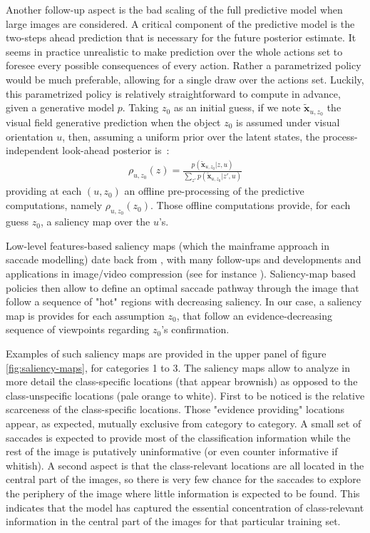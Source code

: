 \documentclass{article} %
\begin{document}
Another follow-up aspect is the bad scaling of the full predictive model when large images are considered. A critical component of the predictive model is the two-steps ahead prediction that is necessary for the future posterior estimate. It seems in practice unrealistic to make prediction over the whole actions set to foresee every possible consequences of every action. Rather a parametrized policy would be much preferable, allowing for a single draw over the actions set.
Luckily, this parametrized policy is relatively straightforward to compute in advance, given a generative model $p$. Taking $z_0$ as an initial guess, if we note $\tilde{\boldsymbol{x}}_{u,z_0}$ the visual field generative prediction when the object $z_0$ is assumed under visual orientation $u$, then, assuming a uniform prior over the latent states, the process-independent look-ahead posterior is~:
\begin{align}
\rho_{u, z_0} (z)=  \frac{p(\tilde{\boldsymbol{x}}_{u, z_0}|z,u)}{\sum_{z'} p(\tilde{\boldsymbol{x}}_{u, z_0}|z',u)}
\end{align}
providing at each $(u, z_0)$ an offline pre-processing of the predictive computations, namely $\rho_{u, z_0}(z_0)$. Those offline computations provide, for each guess $z_0$, a saliency map over the $u$'s. 

Low-level features-based saliency maps (which the mainframe approach in saccade modelling) date back from \cite{itti2001computational}, with many follow-ups and developments and applications in image/video compression (see for instance \cite{wang2003foveation}). Saliency-map based policies then allow to define an optimal saccade pathway through the image that follow a sequence of "hot" regions with decreasing saliency.
In our case, a saliency map is provides for each assumption $z_0$, that follow an evidence-decreasing sequence of viewpoints regarding $z_0$'s confirmation. 

Examples of such saliency maps are provided in the upper panel of figure \ref{fig:saliency-maps}, for categories 1 to 3. The saliency maps allow to analyze in more detail the class-specific locations (that appear brownish) as opposed to the class-unspecific locations (pale orange to white). First to be noticed is the relative scarceness of the class-specific locations. Those "evidence providing" locations appear, as expected, mutually exclusive from category to category. A small set of saccades is expected to provide most of the classification information while the rest of the image is putatively uninformative (or even counter informative if whitish). A second aspect is that the class-relevant locations are all located in the central part of the images, so there is very few chance for the saccades to explore the periphery of the image where little information is expected to be found. This indicates that the model has captured the essential concentration of class-relevant information in the central part of the images for that particular training set.
\end{document}

